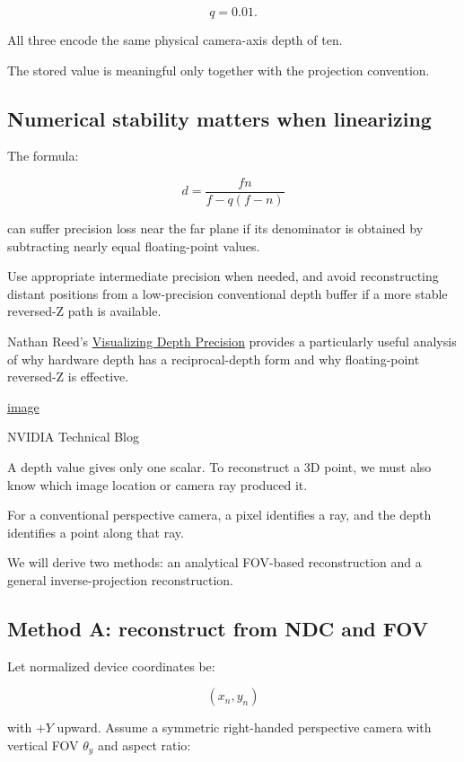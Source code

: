 \[ \boxed{q=0.01}. \]

All three encode the same physical camera-axis depth of ten.

The stored value is meaningful only together with the projection convention.

\subsection{Numerical stability matters when linearizing}\label{02-foundations-ii-ch035-numerical-stability-matters-when-linearizing}

The formula:

\[ d=\frac{fn}{f-q(f-n)} \]

can suffer precision loss near the far plane if its denominator is obtained by subtracting nearly equal floating-point values.

Use appropriate intermediate precision when needed, and avoid reconstructing distant positions from a low-precision conventional depth buffer if a more stable reversed-Z path is available.

Nathan Reed's \href{https://developer.nvidia.com/blog/visualizing-depth-precision/?utm_source=chatgpt.com}{Visualizing Depth Precision} provides a particularly useful analysis of why hardware depth has a reciprocal-depth form and why floating-point reversed-Z is effective. 

\href{https://www.google.com/s2/favicons?domain=https://developer.nvidia.com&sz=32}{image}

NVIDIA Technical Blog

A depth value gives only one scalar. To reconstruct a 3D point, we must also know which image location or camera ray produced it.

For a conventional perspective camera, a pixel identifies a ray, and the depth identifies a point along that ray.

We will derive two methods: an analytical FOV-based reconstruction and a general inverse-projection reconstruction.

\subsection{Method A: reconstruct from NDC and FOV}\label{02-foundations-ii-ch035-method-a-reconstruct-from-ndc-and-fov}

Let normalized device coordinates be:

\[ (x_n,y_n) \]

with \(+Y\) upward. Assume a symmetric right-handed perspective camera with vertical FOV \(\theta_y\) and aspect ratio:

